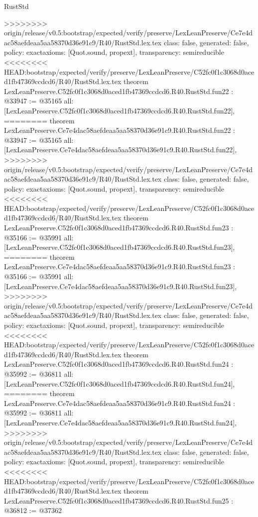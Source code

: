 \begin{lexlean}{RustStd}
\begin{coremodule}
{\begin{coremodule}
{{{{{{{{{{{{{{{{{{{{{{{{{>>>>>>>> origin/release/v0.5:bootstrap/expected/verify/preserve/LexLeanPreserve/Ce7e4dac58aefdeaa5aa58370d36e91c9/R40/RustStd.lex.tex
  class: false,
  generated: false,
  policy: exact{axioms: [Quot.sound, propext]},
  transparency: semireducible
}
<<<<<<<< HEAD:bootstrap/expected/verify/preserve/LexLeanPreserve/C52fc0f1c3068d0aced1fb47369ccdcd6/R40/RustStd.lex.tex
theorem LexLeanPreserve.C52fc0f1c3068d0aced1fb47369ccdcd6.R40.RustStd.fun22 : @33947 := @35165 {
  all: [LexLeanPreserve.C52fc0f1c3068d0aced1fb47369ccdcd6.R40.RustStd.fun22],
========
theorem LexLeanPreserve.Ce7e4dac58aefdeaa5aa58370d36e91c9.R40.RustStd.fun22 : @33947 := @35165 {
  all: [LexLeanPreserve.Ce7e4dac58aefdeaa5aa58370d36e91c9.R40.RustStd.fun22],
>>>>>>>> origin/release/v0.5:bootstrap/expected/verify/preserve/LexLeanPreserve/Ce7e4dac58aefdeaa5aa58370d36e91c9/R40/RustStd.lex.tex
  class: false,
  generated: false,
  policy: exact{axioms: [Quot.sound, propext]},
  transparency: semireducible
}
<<<<<<<< HEAD:bootstrap/expected/verify/preserve/LexLeanPreserve/C52fc0f1c3068d0aced1fb47369ccdcd6/R40/RustStd.lex.tex
theorem LexLeanPreserve.C52fc0f1c3068d0aced1fb47369ccdcd6.R40.RustStd.fun23 : @35166 := @35991 {
  all: [LexLeanPreserve.C52fc0f1c3068d0aced1fb47369ccdcd6.R40.RustStd.fun23],
========
theorem LexLeanPreserve.Ce7e4dac58aefdeaa5aa58370d36e91c9.R40.RustStd.fun23 : @35166 := @35991 {
  all: [LexLeanPreserve.Ce7e4dac58aefdeaa5aa58370d36e91c9.R40.RustStd.fun23],
>>>>>>>> origin/release/v0.5:bootstrap/expected/verify/preserve/LexLeanPreserve/Ce7e4dac58aefdeaa5aa58370d36e91c9/R40/RustStd.lex.tex
  class: false,
  generated: false,
  policy: exact{axioms: [Quot.sound, propext]},
  transparency: semireducible
}
<<<<<<<< HEAD:bootstrap/expected/verify/preserve/LexLeanPreserve/C52fc0f1c3068d0aced1fb47369ccdcd6/R40/RustStd.lex.tex
theorem LexLeanPreserve.C52fc0f1c3068d0aced1fb47369ccdcd6.R40.RustStd.fun24 : @35992 := @36811 {
  all: [LexLeanPreserve.C52fc0f1c3068d0aced1fb47369ccdcd6.R40.RustStd.fun24],
========
theorem LexLeanPreserve.Ce7e4dac58aefdeaa5aa58370d36e91c9.R40.RustStd.fun24 : @35992 := @36811 {
  all: [LexLeanPreserve.Ce7e4dac58aefdeaa5aa58370d36e91c9.R40.RustStd.fun24],
>>>>>>>> origin/release/v0.5:bootstrap/expected/verify/preserve/LexLeanPreserve/Ce7e4dac58aefdeaa5aa58370d36e91c9/R40/RustStd.lex.tex
  class: false,
  generated: false,
  policy: exact{axioms: [Quot.sound, propext]},
  transparency: semireducible
}
<<<<<<<< HEAD:bootstrap/expected/verify/preserve/LexLeanPreserve/C52fc0f1c3068d0aced1fb47369ccdcd6/R40/RustStd.lex.tex
theorem LexLeanPreserve.C52fc0f1c3068d0aced1fb47369ccdcd6.R40.RustStd.fun25 : @36812 := @37362 {
}}}}}}}}}}}}}}}}}}}}}}}}}}}}
\end{coremodule}}
\end{coremodule}
\end{lexlean}
